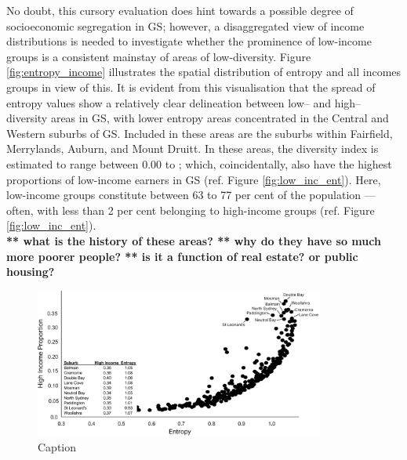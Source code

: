 No doubt, this cursory evaluation does hint towards a possible degree of socioeconomic segregation in GS; however, a disaggregated view of income distributions is needed to investigate whether the prominence of low-income groups is a consistent mainstay of areas of low-diversity. Figure \ref{fig:entropy_income} illustrates the spatial distribution of entropy and all incomes groups in view of this. It is evident from this visualisation that the spread of entropy values show a relatively clear delineation between low-- and high-- diversity areas in GS, with lower entropy areas concentrated in the Central and Western suburbs of GS. Included in these areas are the suburbs within Fairfield, Merrylands, Auburn, and Mount Druitt. In these areas, the diversity index is estimated to range between 0.00 to ; which, coincidentally, also have the highest proportions of low-income earners in GS (ref. Figure \ref{fig:low_inc_ent}). Here, low-income groups constitute between 63 to 77 per cent of the population --- often, with less than 2 per cent belonging to high-income groups (ref. Figure \ref{fig:low_inc_ent}).\\

\textbf{** what is the history of these areas? ** why do they have so much more poorer people? ** is it a function of real estate? or public housing?}\\

\begin{figure}[!ht]
    \centering
    \includegraphics[width=0.85\textwidth]{body/figures/high-inc_ent.png}
    \caption{Caption}
    \label{fig:high-inc_ent}
\end{figure}


